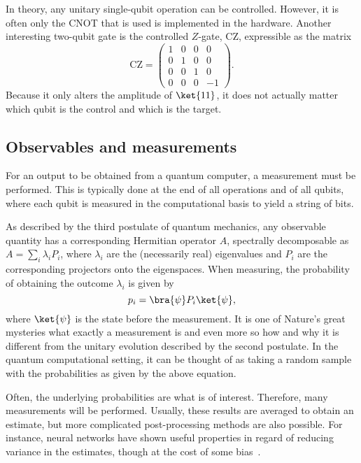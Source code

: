 In theory, any unitary single-qubit operation can be controlled.
However, it is often only the CNOT that is used is implemented in the hardware.
Another interesting two-qubit gate is the controlled $Z$-gate, CZ, expressible as the matrix
\begin{equation}
    \text{CZ} = \begin{pmatrix} 1 & 0 & 0 & 0 \\ 0 & 1 & 0 & 0 \\ 0 & 0 & 1 & 0 \\ 0 & 0 & 0 & -1 \end{pmatrix}.
\end{equation}
Because it only alters the amplitude of $\ket{11}$, it does not actually matter which qubit is the control and which is the target.

\subsection{Observables and measurements}
For an output to be obtained from a quantum computer, a measurement must be performed.
This is typically done at the end of all operations and of all qubits, where each qubit is measured in the computational basis to yield a string of bits.

As described by the third postulate of quantum mechanics, any observable quantity has a corresponding Hermitian operator $A$, spectrally decomposable as $A = \sum_{i} \lambda_i P_i$, where $\lambda_i$ are the (necessarily real) eigenvalues and $P_i$ are the corresponding projectors onto the eigenspaces.
When measuring, the probability of obtaining the outcome $\lambda_i$ is given by
\begin{equation}
    p_i = \bra{\psi} P_i \ket{\psi},
\end{equation}
where $\ket{\psi}$ is the state before the measurement.
It is one of Nature's great mysteries what exactly a measurement is and even more so how and why it is different from the unitary evolution described by the second postulate.
In the quantum computational setting, it can be thought of as taking a random sample with the probabilities as given by the above equation.

Often, the underlying probabilities are what is of interest.
Therefore, many measurements will be performed.
Usually, these results are averaged to obtain an estimate, but more complicated post-processing methods are also possible.
For instance, neural networks have shown useful properties in regard of reducing variance in the estimates, though at the cost of some bias~\autocite{torlai2020}.

